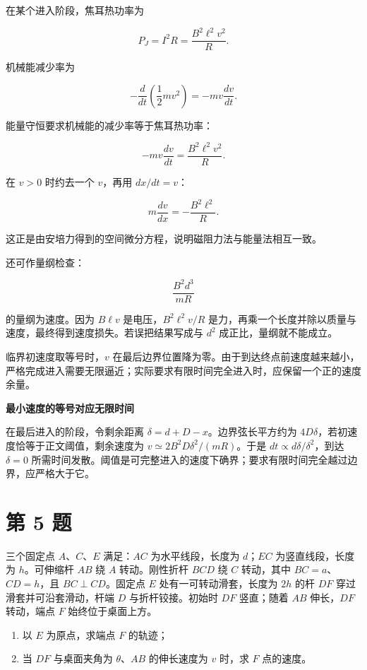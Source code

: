 \documentclass[12pt,a4paper,UTF8]{ctexart}
\newcommand{\tightlist}{\setlength{\itemsep}{0pt}\setlength{\parskip}{0pt}}
\begin{document}
在某个进入阶段，焦耳热功率为

\[
P_J=I^2R
=\frac{B^2\ell^2v^2}{R}.
\]

机械能减少率为

\[
-\frac{d}{dt}\left(\frac12mv^2\right)
=-mv\frac{dv}{dt}.
\]

能量守恒要求机械能的减少率等于焦耳热功率：

\[
-mv\frac{dv}{dt}
=\frac{B^2\ell^2v^2}{R}.
\]

在 \(v>0\) 时约去一个 \(v\)，再用 \(dx/dt=v\)：

\[
m\frac{dv}{dx}=-\frac{B^2\ell^2}{R}.
\]

这正是由安培力得到的空间微分方程，说明磁阻力法与能量法相互一致。

还可作量纲检查：

\[
\frac{B^2d^3}{mR}
\]

的量纲为速度。因为 \(B\ell v\) 是电压，\(B^2\ell^2v/R\)
是力，再乘一个长度并除以质量与速度，最终得到速度损失。若误把结果写成与
\(d^2\) 成正比，量纲就不能成立。

临界初速度取等号时，\(v\)
在最后边界位置降为零。由于到达终点前速度越来越小，严格完成进入需要无限逼近；实际要求有限时间完全进入时，应保留一个正的速度余量。

\textbf{最小速度的等号对应无限时间}

在最后进入的阶段，令剩余距离 \(\delta=d+D-x\)。边界弦长平方约为
\(4D\delta\)，若初速度恰等于正文阈值，剩余速度为
\(v\simeq2B^2D\delta^2/(mR)\)。于是 \(dt\propto d\delta/\delta^2\)，到达
\(\delta=0\)
所需时间发散。阈值是可完整进入的速度下确界；要求有限时间完全越过边界，应严格大于它。

\newpage

\section{第 5 题}\label{ux7b2c-5-ux9898}

三个固定点 \(A\)、\(C\)、\(E\) 满足：\(AC\) 为水平线段，长度为
\(d\)；\(EC\) 为竖直线段，长度为 \(h\)。可伸缩杆 \(AB\) 绕 \(A\)
转动。刚性折杆 \(BCD\) 绕 \(C\) 转动，其中 \(BC=a\)、\(CD=h\)，且
\(BC\perp CD\)。固定点 \(E\) 处有一可转动滑套，长度为 \(2h\) 的杆 \(DF\)
穿过滑套并可沿套滑动，杆端 \(D\) 与折杆铰接。初始时 \(DF\) 竖直；随着
\(AB\) 伸长，\(DF\) 转动，端点 \(F\) 始终位于桌面上方。

\begin{enumerate}
\def\labelenumi{\arabic{enumi}.}
\tightlist
\item
  以 \(E\) 为原点，求端点 \(F\) 的轨迹；
\item
  当 \(DF\) 与桌面夹角为 \(\theta\)、\(AB\) 的伸长速度为 \(v\) 时，求
  \(F\) 点的速度。
\end{enumerate}
\end{document}
